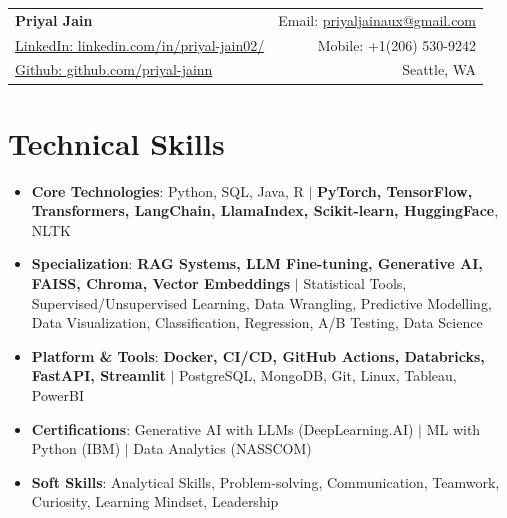 \documentclass[letterpaper,10pt]{article}
\newcommand{\resumeItem}[2]{
  \item\small{
    \textbf{#1}: #2 \vspace{-2pt}
  }
}
\newcommand{\resumeSubItem}[2]{\resumeItem{#1}{#2}\vspace{-1pt}}
\newcommand{\resumeSubHeadingListStart}{\begin{itemize}[leftmargin=*]}
\newcommand{\resumeSubHeadingListEnd}{\end{itemize}}
\begin{document}
\begin{tabular*}{\textwidth}{l@{\extracolsep{\fill}}r}
  \textbf{{\LARGE Priyal Jain}} & Email: \href{mailto:priyaljainaux@gmail.com}{priyaljainaux@gmail.com} \\
  \href{https://www.linkedin.com/in/priyal-jain02/}{LinkedIn: linkedin.com/in/priyal-jain02/} & Mobile: +1(206) 530-9242 \\
  \href{https://github.com/priyal-jainn}{Github: github.com/priyal-jainn} & Seattle, WA \\
\end{tabular*}



\section{Technical Skills}
\vspace{-2pt}
\resumeSubHeadingListStart
\resumeSubItem{Core Technologies}{Python, SQL, Java, R $|$ \textbf{PyTorch, TensorFlow, Transformers, LangChain, LlamaIndex, Scikit-learn, HuggingFace}, NLTK}
\resumeSubItem{Specialization}{\textbf{RAG Systems, LLM Fine-tuning, Generative AI, FAISS, Chroma, Vector Embeddings} $|$ Statistical Tools, Supervised/Unsupervised Learning, Data Wrangling, Predictive Modelling, Data Visualization, Classification, Regression, A/B Testing, Data Science}
\resumeSubItem{Platform \& Tools}{\textbf{Docker, CI/CD, GitHub Actions, Databricks, FastAPI, Streamlit} $|$ PostgreSQL, MongoDB, Git, Linux, Tableau, PowerBI}
\resumeSubItem{Certifications}{Generative AI with LLMs (DeepLearning.AI) $|$ ML with Python (IBM) $|$ Data Analytics (NASSCOM)}
\resumeSubItem{Soft Skills}{Analytical Skills, Problem-solving, Communication, Teamwork, Curiosity, Learning Mindset, Leadership}
\resumeSubHeadingListEnd
\vspace{-3pt}
\end{document}
